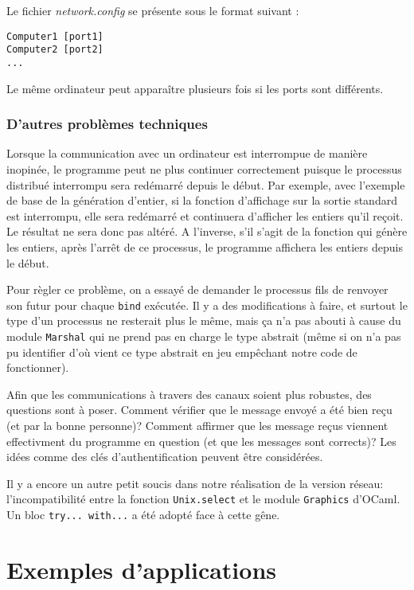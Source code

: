 Le fichier \emph{network.config} se présente sous le format suivant :

\begin{verbatim}
Computer1 [port1]
Computer2 [port2]
...
\end{verbatim}

Le même ordinateur peut apparaître plusieurs fois si les ports sont
différents.

\subsubsection{D'autres problèmes
techniques}\label{dautres-probluxe8mes-techniques}

Lorsque la communication avec un ordinateur est interrompue de manière
inopinée, le programme peut ne plus continuer correctement puisque le
processus distribué interrompu sera redémarré depuis le début. Par
exemple, avec l'exemple de base de la génération d'entier, si la
fonction d'affichage sur la sortie standard est interrompu, elle sera
redémarré et continuera d'afficher les entiers qu'il reçoit. Le résultat
ne sera donc pas altéré. A l'inverse, s'il s'agit de la fonction qui
génère les entiers, après l'arrêt de ce processus, le programme
affichera les entiers depuis le début.

Pour règler ce problème, on a essayé de demander le processus fils de
renvoyer son futur pour chaque \texttt{bind} exécutée. Il y a des
modifications à faire, et surtout le type d'un processus ne resterait
plus le même, mais ça n'a pas abouti à cause du module \texttt{Marshal}
qui ne prend pas en charge le type abstrait (même si on n'a pas pu
identifier d'où vient ce type abstrait en jeu empêchant notre code de
fonctionner).

Afin que les communications à travers des canaux soient plus robustes,
des questions sont à poser. Comment vérifier que le message envoyé a été
bien reçu (et par la bonne personne)? Comment affirmer que les message
reçus viennent effectivment du programme en question (et que les
messages sont corrects)? Les idées comme des clés d'authentification
peuvent être considérées.

Il y a encore un autre petit soucis dans notre réalisation de la version
réseau: l'incompatibilité entre la fonction \texttt{Unix.select} et le
module \texttt{Graphics} d'OCaml. Un bloc \texttt{try... with...} a été
adopté face à cette gêne.

\section{Exemples d'applications}\label{exemples-dapplications}

